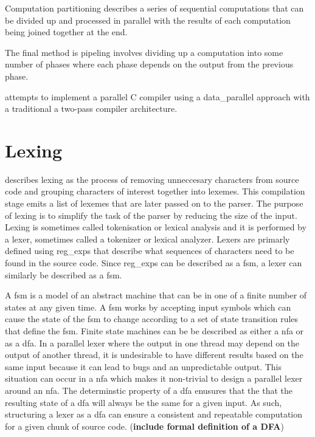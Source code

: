 Computation partitioning describes a series of sequential computations that can
be divided up and processed in parallel with the results of each computation
being joined together at the end.

The final method is pipeling involves dividing up a computation into some
number of phases where each phase depends on the output from the previous
phase. 

\cite{mark_thierry_vandevoorde_parallel_1988} attempts to implement a parallel
C compiler using a \gls{data_parallel} approach with a traditional a two-pass
compiler architecture.

\section{Lexing} \label{lit_review_lexing}

\cite{scott_programming_2015} describes lexing as the process of removing
unneccesary characters from source code and grouping characters of interest
together into lexemes. This compilation stage emits a list of lexemes that are
later passed on to the parser. The purpose of lexing is to simplify the task
of the parser by reducing the size of the input. Lexing is sometimes  called
tokenisation or lexical analysis and it is performed by a lexer, sometimes
called a tokenizer or lexical analyzer. Lexers are primarly defined using
\glspl{reg_exp} that describe what sequences of characters need to be found in
the source code. Since \glspl{reg_exp} can be described as a \gls{fsm}, a lexer
can similarly be described as a \gls{fsm}.

A \gls{fsm} is a model of an abstract machine that can be in one of a finite
number of states at any given time. A \gls{fsm} works by accepting input symbols
which can cause the state of the \gls{fsm} to change according to a set of
state transition rules that define the \gls{fsm}. Finite state machines can
be be described as either a \gls{nfa} or as a \gls{dfa}. In a parallel lexer
where the output in one thread may depend on the output of another thread,
it is undesirable to have different results based on the same input because
it can lead to bugs and an unpredictable output. This situation can occur in
a \gls{nfa} which makes it non-trivial to design a parallel lexer around an
\gls{nfa}. The determinstic property of a \gls{dfa} enusures that the that the
resulting state of a \gls{dfa} will always be the same for a given input.  As
such, structuring a lexer as a \gls{dfa} can ensure a consistent and repeatable
computation for a given chunk of source code. (\textbf{include formal definition
of a DFA})

